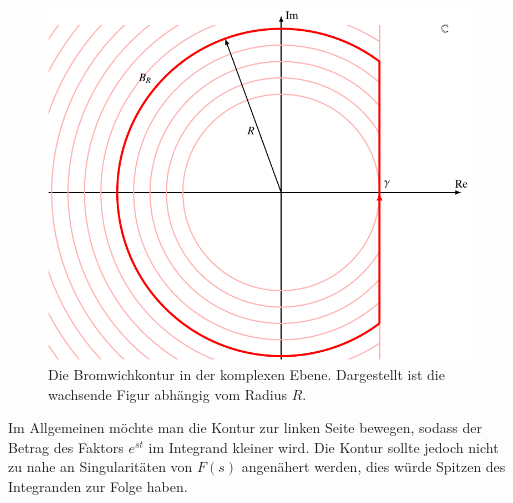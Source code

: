 \begin{figure}
\centering
\includegraphics{papers/laplace/images/bromwich.pdf}
\caption{Die Bromwichkontur in der komplexen Ebene. Dargestellt ist die wachsende Figur abhängig vom Radius $R$.
\label{laplace:bromwichkontur}
}
\end{figure}

Im Allgemeinen möchte man die Kontur zur linken Seite bewegen, sodass der Betrag des Faktors $e^{st}$ im Integrand kleiner wird.
Die Kontur sollte jedoch nicht zu nahe an Singularitäten von $F(s)$ angenähert werden, dies würde Spitzen des Integranden zur Folge haben.

